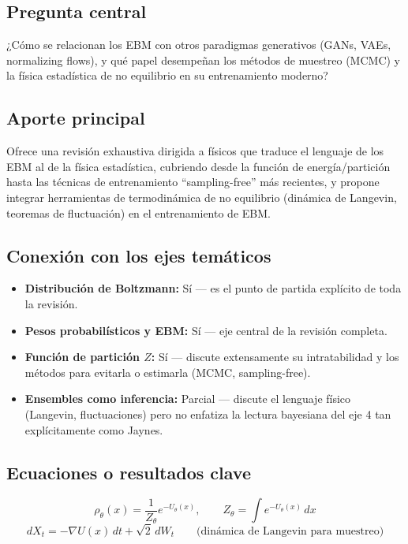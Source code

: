 \documentclass[12pt]{article}
\begin{document}
\subsection*{Pregunta central}
¿Cómo se relacionan los EBM con otros paradigmas generativos (GANs, VAEs, normalizing flows), y
qué papel desempeñan los métodos de muestreo (MCMC) y la física estadística de no equilibrio en
su entrenamiento moderno?

\subsection*{Aporte principal}
Ofrece una revisión exhaustiva dirigida a físicos que traduce el lenguaje de los EBM al de la
física estadística, cubriendo desde la función de energía/partición hasta las técnicas de
entrenamiento ``sampling-free'' más recientes, y propone integrar herramientas de termodinámica
de no equilibrio (dinámica de Langevin, teoremas de fluctuación) en el entrenamiento de EBM.

\subsection*{Conexión con los ejes temáticos}
\begin{itemize}
  \item \textbf{Distribución de Boltzmann:} Sí --- es el punto de partida explícito de toda la revisión.
  \item \textbf{Pesos probabilísticos y EBM:} Sí --- eje central de la revisión completa.
  \item \textbf{Función de partición $Z$:} Sí --- discute extensamente su intratabilidad y los métodos para evitarla o estimarla (MCMC, sampling-free).
  \item \textbf{Ensembles como inferencia:} Parcial --- discute el lenguaje físico (Langevin, fluctuaciones) pero no enfatiza la lectura bayesiana del eje 4 tan explícitamente como Jaynes.
\end{itemize}

\subsection*{Ecuaciones o resultados clave}
\begin{equation}
\rho_\theta(x) = \frac{1}{Z_\theta} e^{-U_\theta(x)}, \qquad Z_\theta = \int e^{-U_\theta(x)}\,dx
\end{equation}
\begin{equation}
dX_t = -\nabla U(x)\,dt + \sqrt{2}\,dW_t \qquad \text{(dinámica de Langevin para muestreo)}
\end{equation}
\end{document}
